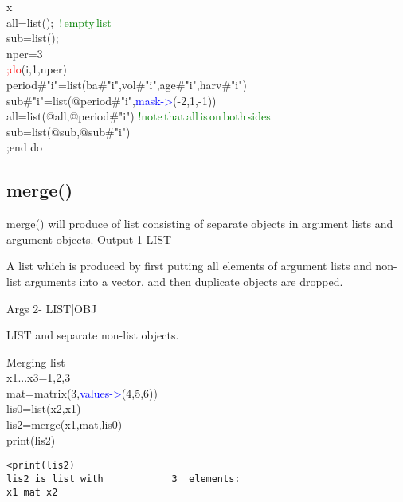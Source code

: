 \begin{itemize}
\begin{example}[list2ex]x\\
\label{list2ex}
all=\textcolor{VioletRed}{list}(); \,\textcolor{green}{!\,empty\,list}\\
sub=\textcolor{VioletRed}{list}();\\
nper=3\\
\textcolor{Red}{;do}(i,1,nper)\\
period\#"i"=\textcolor{VioletRed}{list}(ba\#"i",vol\#"i",age\#"i",harv\#"i")\\
sub\#"i"=\textcolor{VioletRed}{list}(@period\#"i",\textcolor{blue}{mask->}(-2,1,-1))\\
all=\textcolor{VioletRed}{list}(@all,@period\#"i") \textcolor{green}{!note\,that\,all\,is\,on\,both\,sides}\\
sub=\textcolor{VioletRed}{list}(@sub,@sub\#"i")\\
;end do
\end{example}
\subsection{\textcolor{VioletRed}{merge}()}
\label{merge}
\textcolor{VioletRed}{merge}() will produce of list consisting of separate objects
in argument lists and argument objects.
\vspace{0.3cm}
\hline
\vspace{0.3cm}
\noindent Output \tabto{3cm} 1 \tabto{5cm}  LIST \tabto{7cm}
\begin{changemargin}{3cm}{0cm}
\noindent A list which is produced by first putting all elements of
argument lists and non-list arguments into a vector, and then duplicate objects are dropped.
\end{changemargin}
\vspace{0.3cm}
\hline
\vspace{0.3cm}
\noindent Args \tabto{3cm} 2- \tabto{5cm}  LIST|OBJ \tabto{7cm}
\begin{changemargin}{3cm}{0cm}
\noindent  LIST and separate non-list objects.
\end {changemargin}
\hline
\vspace{0.2cm}
\begin{example}[mergex]Merging list\\
\label{mergex}
x1...x3=1,2,3\\
mat=\textcolor{VioletRed}{matrix}(3,\textcolor{blue}{values->}(4,5,6))\\
lis0=\textcolor{VioletRed}{list}(x2,x1)\\
lis2=\textcolor{VioletRed}{merge}(x1,mat,lis0)\\
\textcolor{VioletRed}{print}(lis2)
\color{Green}
\begin{verbatim}
<print(lis2)
lis2 is list with            3  elements:
x1 mat x2
\end{verbatim}
\color{Black}
\end{example}

\end{itemize}
